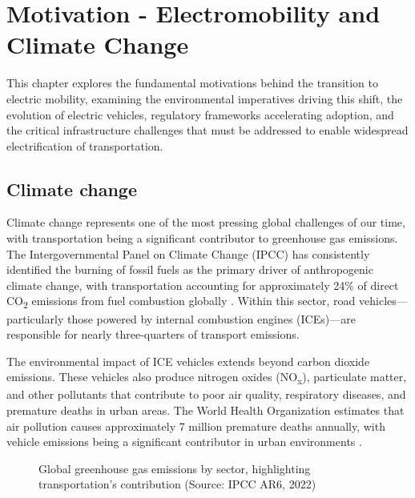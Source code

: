
\setchapterpreamble[u]{\margintoc}
\chapter{Motivation - Electromobility and Climate Change}

This chapter explores the fundamental motivations behind the transition to electric mobility, examining the environmental imperatives driving this shift, the evolution of electric vehicles, regulatory frameworks accelerating adoption, and the critical infrastructure challenges that must be addressed to enable widespread electrification of transportation.

\section{Climate change}

Climate change represents one of the most pressing global challenges of our time, with transportation being a significant contributor to greenhouse gas emissions. The Intergovernmental Panel on Climate Change (IPCC) has consistently identified the burning of fossil fuels as the primary driver of anthropogenic climate change, with transportation accounting for approximately 24\% of direct CO\textsubscript{2} emissions from fuel combustion globally \cite{ipcc2022}. Within this sector, road vehicles—particularly those powered by internal combustion engines (ICEs)—are responsible for nearly three-quarters of transport emissions.

The environmental impact of ICE vehicles extends beyond carbon dioxide emissions. These vehicles also produce nitrogen oxides (NO\textsubscript{x}), particulate matter, and other pollutants that contribute to poor air quality, respiratory diseases, and premature deaths in urban areas. The World Health Organization estimates that air pollution causes approximately 7 million premature deaths annually, with vehicle emissions being a significant contributor in urban environments \cite{who2021}.

\begin{figure}[h]
    \centering
    \caption{Global greenhouse gas emissions by sector, highlighting transportation's contribution (Source: IPCC AR6, 2022)}
    \label{fig:emissions-chart}
\end{figure}

